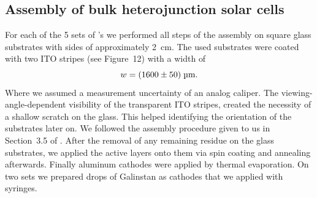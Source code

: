 \documentclass[a4paper,10pt,twocolumn]{article}
\begin{document}
\begin{extract*}
\section{Assembly of bulk heterojunction solar cells}\label{sec:assembly}
For each of the 5 sets of \BHSC's we performed all steps of the assembly on square glass substrates with sides of approximately 2~cm. The used substrates were coated with two ITO stripes (see \cite{labdesc} Figure~12) with a width of
\begin{equation*}
w = (1600\pm50)\;\text{\textmu m}.
\end{equation*}
Where we assumed a measurement uncertainty of an analog caliper. The viewing-angle-dependent visibility of the transparent ITO stripes, created the necessity of a shallow scratch on the glass. This helped identifying the orientation of the substrates later on.\mypar
We followed the assembly procedure given to us in Section~3.5 of \cite{labdesc}. After the removal of any remaining residue on the glass substrates, we applied the active layers onto them via spin coating and annealing afterwards. Finally aluminum cathodes were applied by thermal evaporation. On two sets we prepared drops of Galinstan as cathodes that we applied with syringes. 


\end{extract*}
\end{document}
